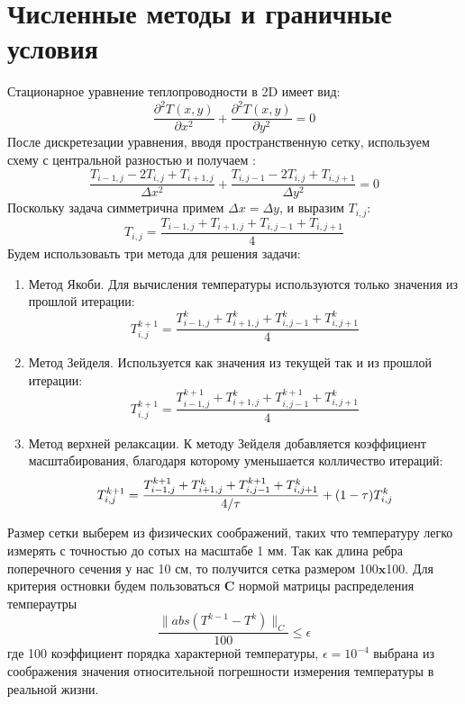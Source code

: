 \documentclass[20pt]{article}
\begin{document}
\section{Численные методы и граничные условия}
    Стационарное уравнение теплопроводности в 2D имеет вид:
    $$\frac{\partial ^2T(x,y)}{\partial x^2} + \frac{\partial ^2T(x,y)}{\partial y^2} = 0$$
    После дискретезации уравнения, вводя пространственную сетку, используем схему с центральной разностью и получаем :
    $$\frac{T_{i-1,j}-2T_{i,j}+T_{i+1,j}}{\Delta x^2} + \frac{T_{i,j-1}-2T_{i,j}+T_{i,j+1}}{\Delta y^2} = 0{}$$
    Поскольку задача симметрична примем $\Delta x = \Delta y$, и выразим $T_{i,j}$:
    $$T_{i,j} = \frac{T_{i-1,j}+T_{i+1,j}+T_{i,j-1}+T_{i,j+1}}{4}$$
    Будем использоваьть три метода для решения задачи:
     \begin{enumerate}
     \item $\textbf{Метод Якоби.}$ Для вычисления температуры используются только значения из прошлой итерации:
     $$T^{k+1}_{i,j} = \frac{T^{k}_{i-1,j}+T^{k}_{i+1,j}+T^{k}_{i,j-1}+T^{k}_{i,j+1}}{4}$$
     \item $\textbf {Метод Зейделя.}$ Используется как значения из текущей так и из прошлой итерации:
     $$T^{k+1}_{i,j} = \frac{T^{k+1}_{i-1,j}+T^{k}_{i+1,j}+T^{k+1}_{i,j-1}+T^{k}_{i,j+1}}{4}$$
     \item $\textbf {Метод верхней релаксации.}$ К методу Зейделя добавляется коэффициент масштабирования, благодаря которому уменьшается колличество итераций:
     $$T^{k+1}_{i,j} = \frac{T^{k+1}_{i-1,j}+T^{k}_{i+1,j}+T^{k+1}_{i,j-1}+T^{k}_{i,j+1}}{4/\tau} + (1 - \tau)\*T^{k}_{i,j}$$
     \end{enumerate}
    Размер сетки выберем из физических соображений, таких что температуру легко измерять с точностью до сотых на масштабе 1 мм. Так как длина ребра поперечного сечения у нас 10 см, то получится сетка размером 100$\textbf{x}$100. 
    Для критерия остновки будем пользоваться $\textbf{C}$ нормой матрицы распределения темпераутры  $$\frac{\|abs(T^{k-1} - T^{k})\|_{C}}{100 } \leq \epsilon$$ где 100 коэффициент порядка характерной температуры, $\epsilon = 10^{-4}$ выбрана из соображения значения относительной погрешности измерения температуры в реальной жизни.
    
\end{document}
